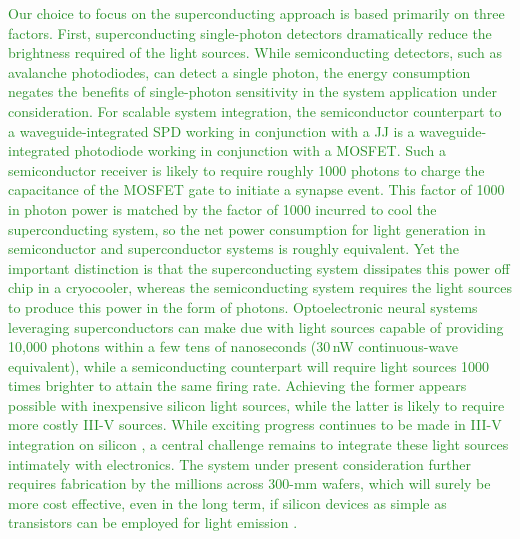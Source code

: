 \documentclass[twocolumn]{article}
\begin{document}
\textcolor{ForestGreen}{Our choice to focus on the superconducting approach is based primarily on three factors. First, superconducting single-photon detectors dramatically reduce the brightness required of the light sources. While semiconducting detectors, such as avalanche photodiodes, can detect a single photon, the energy consumption negates the benefits of single-photon sensitivity in the system application under consideration. For scalable system integration, the semiconductor counterpart to a waveguide-integrated SPD working in conjunction with a JJ is a waveguide-integrated photodiode working in conjunction with a MOSFET. Such a semiconductor receiver is likely to require roughly 1000 photons to charge the capacitance of the MOSFET gate \cite{mi2017} to initiate a synapse event. This factor of 1000 in photon power is matched by the factor of 1000 incurred to cool the superconducting system, so the net power consumption for light generation in semiconductor and superconductor systems is roughly equivalent. Yet the important distinction is that the superconducting system dissipates this power off chip in a cryocooler, whereas the semiconducting system requires the light sources to produce this power in the form of photons. Optoelectronic neural systems leveraging superconductors can make due with light sources capable of providing 10,000 photons within a few tens of nanoseconds (30\,nW continuous-wave equivalent), while a semiconducting counterpart will require light sources 1000 times brighter to attain the same firing rate. Achieving the former appears possible with inexpensive silicon light sources, while the latter is likely to require more costly III-V sources. While exciting progress continues to be made in III-V integration on silicon \cite{hala2020}, a central challenge remains to integrate these light sources intimately with electronics. The system under present consideration further requires fabrication by the millions across 300-mm wafers, which will surely be more cost effective, even in the long term, if silicon devices as simple as transistors can be employed for light emission \cite{buch2017}.}
\end{document}
